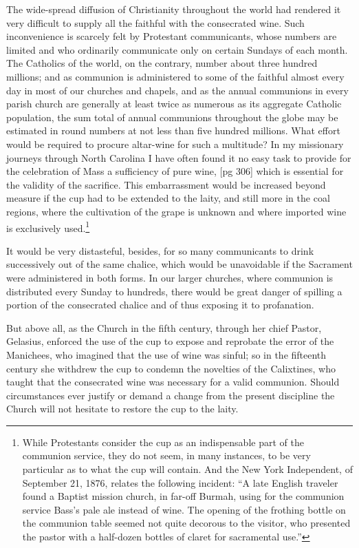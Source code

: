 The wide-spread diffusion of Christianity
throughout the world had rendered it very difficult
to supply all the faithful with the consecrated
wine. Such inconvenience is scarcely felt by Protestant
communicants, whose numbers are limited
and who ordinarily communicate only on certain
Sundays of each month. The Catholics of the
world, on the contrary, number about three hundred
millions; and as communion is administered
to some of the faithful almost every day
in most of our churches and chapels, and as the
annual communions in every parish church are
generally at least twice as numerous as its aggregate
Catholic population, the sum total of annual
communions throughout the globe may be estimated
in round numbers at not less than five hundred
millions. What effort would be required to
procure altar-wine for such a multitude? In my
missionary journeys through North Carolina I
have often found it no easy task to provide for the
celebration of Mass a sufficiency of pure wine,
[pg 306]
which is essential for the validity of the sacrifice.
This embarrassment would be increased beyond
measure if the cup had to be extended to the laity,
and still more in the coal regions, where the cultivation
of the grape is unknown and where imported
wine is exclusively used.\footnote{While Protestants
consider the cup as an indispensable
part of the communion service, they do not seem, in many instances,
to be very particular as to what the cup will contain.
And the New York Independent, of September 21, 1876, relates
the following incident: “A late English traveler found a Baptist
mission church, in far-off Burmah, using for the communion
service Bass's pale ale instead of wine. The opening
of the frothing bottle on the communion table seemed
not quite decorous to the visitor, who presented the pastor
with a half-dozen bottles of claret for sacramental use.”}

It would be very distasteful, besides, for so
many communicants to drink successively out of
the same chalice, which would be unavoidable if the
Sacrament were administered in both forms. In
our larger churches, where communion is distributed
every Sunday to hundreds, there would be
great danger of spilling a portion of the consecrated
chalice and of thus exposing it to profanation.

But above all, as the Church in the fifth century,
through her chief Pastor, Gelasius, enforced the
use of the cup to expose and reprobate the error
of the Manichees, who imagined that the use of
wine was sinful; so in the fifteenth century she
withdrew the cup to condemn the novelties of the
Calixtines, who taught that the consecrated wine
was necessary for a valid communion. Should circumstances
ever justify or demand a change from
the present discipline the Church will not hesitate
to restore the cup to the laity.


